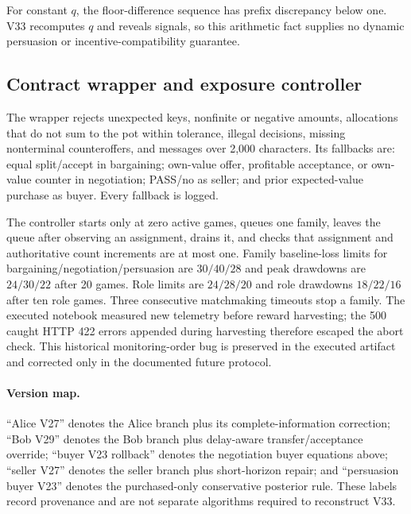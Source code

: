For constant $q$, the floor-difference sequence has prefix discrepancy below
one. V33 recomputes $q$ and reveals signals, so this arithmetic fact supplies no
dynamic persuasion or incentive-compatibility guarantee.

\subsection{Contract wrapper and exposure controller}

The wrapper rejects unexpected keys, nonfinite or negative amounts, allocations
that do not sum to the pot within tolerance, illegal decisions, missing
nonterminal counteroffers, and messages over 2,000 characters. Its fallbacks
are: equal split/accept in bargaining; own-value offer, profitable acceptance,
or own-value counter in negotiation; PASS/no as seller; and prior expected-value
purchase as buyer. Every fallback is logged.

The controller starts only at zero active games, queues one family, leaves the
queue after observing an assignment, drains it, and checks that assignment and
authoritative count increments are at most one. Family baseline-loss limits for
bargaining/negotiation/persuasion are $30/40/28$ and peak drawdowns are
$24/30/22$ after 20 games. Role limits are $24/28/20$ and role drawdowns
$18/22/16$ after ten role games. Three consecutive matchmaking timeouts stop a
family. The executed notebook measured new telemetry before reward harvesting;
the 500 caught HTTP 422 errors appended during harvesting therefore escaped the
abort check. This historical monitoring-order bug is preserved in the executed
artifact and corrected only in the documented future protocol.

\paragraph{Version map.}
``Alice V27'' denotes the Alice branch plus its complete-information correction;
``Bob V29'' denotes the Bob branch plus delay-aware transfer/acceptance override;
``buyer V23 rollback'' denotes the negotiation buyer equations above;
``seller V27'' denotes the seller branch plus short-horizon repair; and
``persuasion buyer V23'' denotes the purchased-only conservative posterior rule.
These labels record provenance and are not separate algorithms required to
reconstruct V33.
